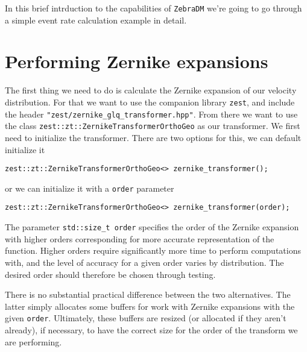 \documentclass{article}
\begin{document}
In this brief intrduction to the capabilities of \texttt{ZebraDM} we're going to go through a simple event rate calculation example in detail.

\section{Performing Zernike expansions}

The first thing we need to do is calculate the Zernike expansion of our velocity distribution. For that we want to use the companion library \texttt{zest}, and include the header \texttt{"zest/zernike_glq_transformer.hpp"}. From there we want to use the class \texttt{zest::zt::ZernikeTransformerOrthoGeo} as our transformer. We first need to initialize the transformer. There are two options for this, we can default initialize it
\begin{verbatim}
zest::zt::ZernikeTransformerOrthoGeo<> zernike_transformer();
\end{verbatim}
or we can initialize it with a \texttt{order} parameter
\begin{verbatim}
zest::zt::ZernikeTransformerOrthoGeo<> zernike_transformer(order);
\end{verbatim}
The parameter \texttt{std::size_t order} specifies the order of the Zernike expansion with higher orders corresponding for more accurate representation of the function. Higher orders require significantly more time to perform computations with, and the level of accuracy for a given order varies by distribution. The desired order should therefore be chosen through testing.

There is no substantial practical difference between the two alternatives. The latter simply allocates some buffers for work with Zernike expansions with the given \texttt{order}. Ultimately, these buffers are resized (or allocated if they aren't already), if necessary, to have the correct size for the order of the transform we are performing.
\end{document}
